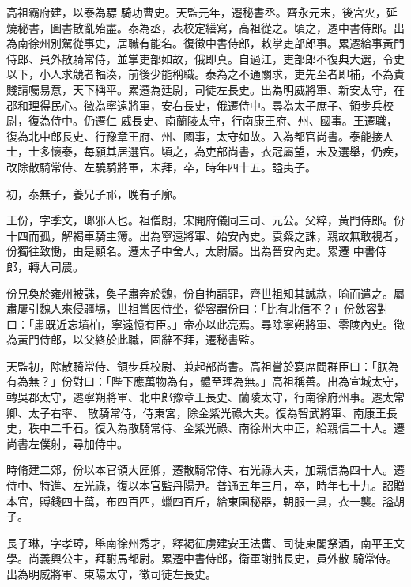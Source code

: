 \begin{pinyinscope}
 高祖霸府建，以泰為驃
 騎功曹史。天監元年，遷秘書丞。齊永元末，後宮火，延燒秘書，圖書散亂殆盡。泰為丞，表校定繕寫，高祖從之。頃之，遷中書侍郎。出為南徐州別駕從事史，居職有能名。復徵中書侍郎，敕掌吏部郎事。累遷給事黃門侍郎、員外散騎常侍，並掌吏部如故，俄即真。自過江，吏部郎不復典大選，令史以下，小人求競者輻湊，前後少能稱職。泰為之不通關求，吏先至者即補，不為貴賤請囑易意，天下稱平。累遷為廷尉，司徒左長史。出為明威將軍、新安太守，在郡和理得民心。徵為寧遠將軍，安右長史，俄遷侍中。尋為太子庶子、領步兵校尉，復為侍中。仍遷仁
 威長史、南蘭陵太守，行南康王府、州、國事。王遷職，復為北中郎長史、行豫章王府、州、國事，太守如故。入為都官尚書。泰能接人士，士多懷泰，每願其居選官。頃之，為吏部尚書，衣冠屬望，未及選舉，仍疾，改除散騎常侍、左驍騎將軍，未拜，卒，時年四十五。謚夷子。



 初，泰無子，養兄子祁，晚有子廓。



 王份，字季文，瑯邪人也。祖僧朗，宋開府儀同三司、元公。父粹，黃門侍郎。份十四而孤，解褐車騎主簿。出為寧遠將軍、始安內史。袁粲之誅，親故無敢視者，份獨往致慟，由是顯名。遷太子中舍人，太尉屬。出為晉安內史。累遷
 中書侍郎，轉大司農。



 份兄奐於雍州被誅，奐子肅奔於魏，份自拘請罪，齊世祖知其誠款，喻而遣之。屬肅屢引魏人來侵疆埸，世祖嘗因侍坐，從容謂份曰：「比有北信不？」份斂容對曰：「肅既近忘墳柏，寧遠憶有臣。」帝亦以此亮焉。尋除寧朔將軍、零陵內史。徵為黃門侍郎，以父終於此職，固辭不拜，遷秘書監。



 天監初，除散騎常侍、領步兵校尉、兼起部尚書。高祖嘗於宴席問群臣曰：「朕為有為無？」份對曰：「陛下應萬物為有，體至理為無。」高祖稱善。出為宣城太守，轉吳郡太守，遷寧朔將軍、北中郎豫章王長史、蘭陵太守，行南徐府州事。遷太常卿、太子右率、
 散騎常侍，侍東宮，除金紫光祿大夫。復為智武將軍、南康王長史，秩中二千石。復入為散騎常侍、金紫光祿、南徐州大中正，給親信二十人。遷尚書左僕射，尋加侍中。



 時脩建二郊，份以本官領大匠卿，遷散騎常侍、右光祿大夫，加親信為四十人。遷侍中、特進、左光祿，復以本官監丹陽尹。普通五年三月，卒，時年七十九。詔贈本官，賻錢四十萬，布四百匹，蠟四百斤，給東園秘器，朝服一具，衣一襲。謚胡子。



 長子琳，字孝璋，舉南徐州秀才，釋褐征虜建安王法曹、司徒東閣祭酒，南平王文學。尚義興公主，拜駙馬都尉。累遷中書侍郎，衛軍謝朏長史，員外散
 騎常侍。出為明威將軍、東陽太守，徵司徒左長史。




\end{pinyinscope}
